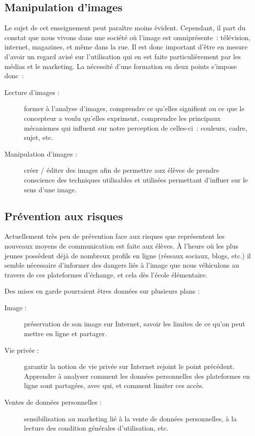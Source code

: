 \subsection{Manipulation d'images}
Le sujet de cet enseignement peut paraître moins évident. Cependant,
il part du constat que nous vivons dans une société où l'image est
omniprésente~: télévision, internet, magazines, et même dans la
rue. Il est donc important d'être en mesure d'avoir un regard avisé
sur l'utilisation qui en est faite particulièrement par les médias et
le marketing. La nécessité d'une formation en deux points s'impose donc~:

\begin{description}
  \item[Lecture d'images :] former à l'analyse d'images, comprendre ce
    qu'elles signifient ou ce que le concepteur a voulu qu'elles expriment,
    comprendre les principaux mécanismes qui influent sur notre
    perception de celles-ci~: couleurs, cadre, sujet, etc.
  \item[Manipulation d'images :] créer / éditer des images afin de
    permettre aux élèves de prendre conscience des techniques
    utilisables et utilisées permettant d'influer sur le sens d'une image.
    
    \cite{book_serusclat}
\end{description}

\subsection{Prévention aux risques}
Actuellement très peu de prévention face aux risques que représentent
les nouveaux moyens de communication est faite aux élèves. À
l'heure où les plus jeunes possèdent déjà de nombreux profils en
ligne (réseaux sociaux, blogs, etc.) il semble nécessaire d'informer
des dangers liés à l'image que nous véhiculons au travers de ces
plateformes d'échange, et cela dès l'école élémentaire.

Des mises en garde pourraient êtres données sur plusieurs plans :

\begin{description}
  \item[Image :] préservation de son image sur Internet, savoir les limites de ce qu'on peut mettre en ligne et partager.
  \item[Vie privée :] garantir la notion de vie privée sur Internet rejoint le point précédent. Apprendre à analyser comment les données personnelles des plateformes en ligne sont partagées, avec qui, et comment limiter ces accès.
  \item[Ventes de données personnelles :] sensibilisation au marketing lié à la vente de données personnelles, à la lecture des condition générales d'utilisation, etc.
\end{description}

